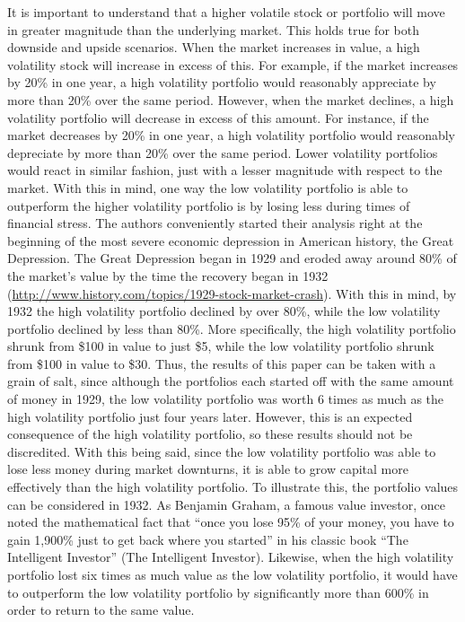\documentclass[12pt,twoside]{reedthesis}
\theoremstyle{definition}
\theoremstyle{definition}
\theoremstyle{definition}
\theoremstyle{remark}
\begin{document}
It is important to understand that a higher volatile stock or portfolio
will move in greater magnitude than the underlying market. This holds
true for both downside and upside scenarios. When the market increases
in value, a high volatility stock will increase in excess of this. For
example, if the market increases by 20\% in one year, a high volatility
portfolio would reasonably appreciate by more than 20\% over the same
period. However, when the market declines, a high volatility portfolio
will decrease in excess of this amount. For instance, if the market
decreases by 20\% in one year, a high volatility portfolio would
reasonably depreciate by more than 20\% over the same period. Lower
volatility portfolios would react in similar fashion, just with a lesser
magnitude with respect to the market. With this in mind, one way the low
volatility portfolio is able to outperform the higher volatility
portfolio is by losing less during times of financial stress. The
authors conveniently started their analysis right at the beginning of
the most severe economic depression in American history, the Great
Depression. The Great Depression began in 1929 and eroded away around
80\% of the market's value by the time the recovery began in 1932
(\url{http://www.history.com/topics/1929-stock-market-crash}). With this
in mind, by 1932 the high volatility portfolio declined by over 80\%,
while the low volatility portfolio declined by less than 80\%. More
specifically, the high volatility portfolio shrunk from \$100 in value
to just \$5, while the low volatility portfolio shrunk from \$100 in
value to \$30. Thus, the results of this paper can be taken with a grain
of salt, since although the portfolios each started off with the same
amount of money in 1929, the low volatility portfolio was worth 6 times
as much as the high volatility portfolio just four years later. However,
this is an expected consequence of the high volatility portfolio, so
these results should not be discredited. With this being said, since the
low volatility portfolio was able to lose less money during market
downturns, it is able to grow capital more effectively than the high
volatility portfolio. To illustrate this, the portfolio values can be
considered in 1932. As Benjamin Graham, a famous value investor, once
noted the mathematical fact that ``once you lose 95\% of your money, you
have to gain 1,900\% just to get back where you started'' in his classic
book ``The Intelligent Investor'' (The Intelligent Investor). Likewise,
when the high volatility portfolio lost six times as much value as the
low volatility portfolio, it would have to outperform the low volatility
portfolio by significantly more than 600\% in order to return to the
same value.
\end{document}
